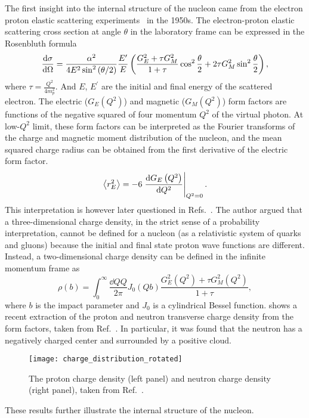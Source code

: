 \documentclass[../main.tex]{subfiles}
\begin{document}
The first insight into the internal structure of the nucleon came from the
electron proton elastic scattering experiments~\cite{hofstadter1956} in the
1950s. The electron-proton elastic scattering cross section at angle $\theta$ in the laboratory
frame can be expressed in the Rosenbluth formula~\cite{rosenbluth1950}
\begin{equation}
	\dv{\sigma}{\Omega} = \frac{\alpha^2}{4E^2 \sin^2\left(\theta/2\right)}
	\frac{E^\prime}{E} \left( \frac{G_E^2+\tau G_M^2}{1+\tau} \cos^2
	\frac{\theta}{2} + 2\tau G_M^2 \sin^2 \frac{\theta}{2}\right)
	\label{eq:ep_cs},
\end{equation}
where $\tau = \frac{Q^2}{4m_p^2}$.
And $E$, $E^\prime$ are the initial and final energy of the scattered electron.
The electric ($G_E\left(Q^2\right)$) and magnetic ($G_M\left(Q^2\right)$) form
factors are functions of the negative squared of four momentum $Q^2$ of the virtual photon. At
low-$Q^2$ limit, these form factors can be interpreted as the Fourier transforms
of the charge and magnetic moment distribution of the nucleon, and the mean squared
charge radius can be obtained from the first derivative of the electric form factor.
\begin{equation}
	\expval{r^2_E}=-6\eval{\dv{G_E\left(Q^2\right)}{Q^2}}_{Q^2=0}.
\end{equation}
This interpretation is however later questioned in Refs.~\cite{miller2007,miller2019}.
The author argued that a three-dimensional charge density, in the strict sense of a
probability interpretation, cannot be defined for a nucleon (as a relativistic system of quarks and gluons)
because the initial and final state proton wave functions are different. Instead,
a two-dimensional charge density can be defined in the infinite momentum frame as
\begin{equation}
	\rho(b)=\int^\infty_0 \frac{\dd{Q}Q}{2\pi} J_0(Qb)\frac{G_E^2(Q^2)+\tau G_M^2(Q^2)}{1+\tau},
\end{equation}
where $b$ is the impact parameter and $J_0$ is a cylindrical Bessel function.
shows a recent extraction of the proton and neutron transverse charge density from the
form factors, taken from Ref.~\cite{miller2007}. In particular, it was found that
the neutron has a negatively charged center and surrounded by a positive cloud.
\begin{figure}[hbp!]
	\centering
	\texttt{[image: charge\_distribution\_rotated]}
	\caption{The proton charge density (left panel) and neutron charge density
		(right panel), taken from Ref.~\cite{miller2007}.}
	\label{fig:charge}
\end{figure}
These results further illustrate the internal structure of the nucleon.
\end{document}
